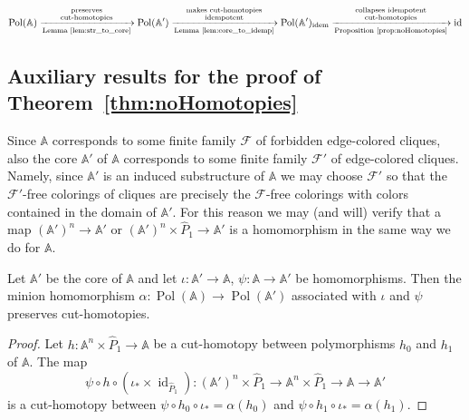 \documentclass[oneside]{amsart}
\newcommand{\str}[1]{\mathbb{#1}}
\newcommand{\cat}[1]{\mathcal{#1}}
\newcommand{\pol}{\operatorname{Pol}}
\newcommand{\idem}{\mathrm{idem}}
\DeclareMathOperator{\id}{id}
\begin{document}
$$
\pol(\str A) 
    \xrightarrow[\text{Lemma~\ref{lem:str_to_core}}]{\substack{\text{preserves}\\\text{cut-homotopies}}}
\pol(\str A') 
    \xrightarrow[\text{Lemma~\ref{lem:core_to_idemp}}]{\substack{\text{makes cut-homotopies}\\\text{idempotent}}}
\pol(\str A')_{\idem} 
    \xrightarrow[\text{Proposition~\ref{prop:noHomotopies}}]{\substack{\text{collapses idempotent}\\\text{cut-homotopies}}}
\id
$$


\subsection{Auxiliary results for the proof of Theorem~\ref{thm:noHomotopies}}

Since $\str A$ corresponds to some finite family $\cat F$ of forbidden edge-colored cliques, also the core $\str A'$ of $\str A$ corresponds to some finite family $\cat F'$ of edge-colored cliques. Namely, since $\str A'$ is an induced substructure of $\str A$ we may choose $\cat F'$ so that the $\cat F'$-free colorings of cliques are precisely the $\cat F$-free colorings with colors contained in the domain of $\str A'$. 
For this reason we may (and will) verify that a map $(\str A')^n \to \str A'$ or $(\str A')^n \times \hat P_1 \to \str A'$ is a homomorphism in the same way we do for $\str A$.

\begin{lemma}\label{lem:str_to_core}
        Let $\str A'$ be the core of $\str A$ and let $\iota\colon \str A'\to \str A$, $\psi\colon \str A\to \str A'$ be homomorphisms. Then the
        minion homomorphism $\alpha\colon\pol(\str A)\to\pol(\str A')$ associated with $\iota$ and $\psi$ preserves cut-homotopies.
\end{lemma}

\begin{proof}
     Let $h\colon \str A^n \times \hat P_1 \to \str A$ be a cut-homotopy between polymorphisms $h_0$ and $h_1$ of $\str A$. The map 
     \begin{equation*}
         \psi\circ h\circ (\iota_* \times \id_{\hat P_1}) \colon (\str A')^n \times \hat P_1 \to \str A^n \times \hat P_1 \to \str A \to \str A'
     \end{equation*}
     is a cut-homotopy between $\psi \circ h_0 \circ \iota_* = \alpha(h_0)$ and $\psi \circ h_1 \circ \iota_* = \alpha(h_1)$.
\end{proof}
\end{document}
